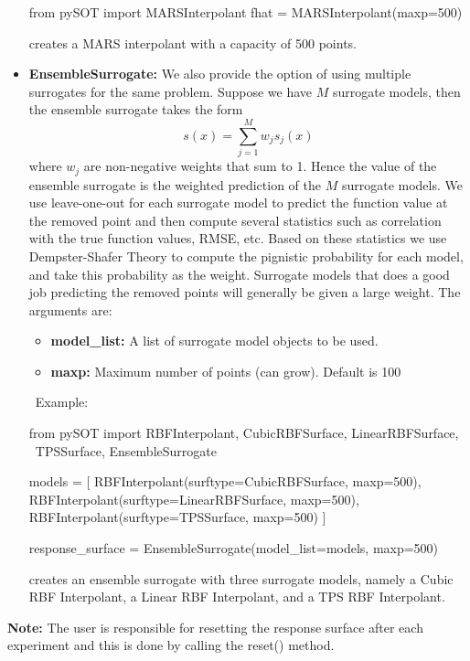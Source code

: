 \documentclass[]{article}
\begin{document}
\begin{itemize}
\begin{python}
from pySOT import MARSInterpolant
fhat = MARSInterpolant(maxp=500)
\end{python}
creates a MARS interpolant with a capacity of 500 points.
\item \textbf{EnsembleSurrogate:} We also provide the option of using multiple surrogates for the same problem. Suppose we have $M$ surrogate models, then the ensemble surrogate takes the form
\begin{equation*}
s(x) = \sum_{j=1}^M w_j s_j(x)
\end{equation*}
where $w_j$ are non-negative weights that sum to 1. Hence the value of the ensemble surrogate is the weighted prediction of the $M$ surrogate models. We use leave-one-out for each surrogate model to predict the function value at the removed point and then compute several statistics such as correlation with the true function values, RMSE, etc.  Based on these statistics we use Dempster-Shafer Theory to compute the pignistic probability for each model, and take this probability as the weight. Surrogate models that does a good job predicting the removed points will generally be given a large weight. The arguments are:
\begin{itemize}
\item \textbf{model\_list:} A list of surrogate model objects to be used.
\item \textbf{maxp:} Maximum number of points (can grow). Default is 100
\end{itemize}
\ \newline Example: 
\begin{python}
from pySOT import RBFInterpolant, CubicRBFSurface, LinearRBFSurface, \ 
		  TPSSurface, EnsembleSurrogate

models = [
	RBFInterpolant(surftype=CubicRBFSurface, maxp=500),
	RBFInterpolant(surftype=LinearRBFSurface, maxp=500),
	RBFInterpolant(surftype=TPSSurface, maxp=500)
]

response_surface = EnsembleSurrogate(model_list=models, maxp=500)
\end{python}
creates an ensemble surrogate with three surrogate models, namely a Cubic RBF Interpolant, a Linear RBF Interpolant, and a TPS RBF Interpolant.
\end{itemize}
\textbf{Note:} The user is responsible for resetting the response surface after each experiment and this is done by calling the reset() method.
\end{document}
